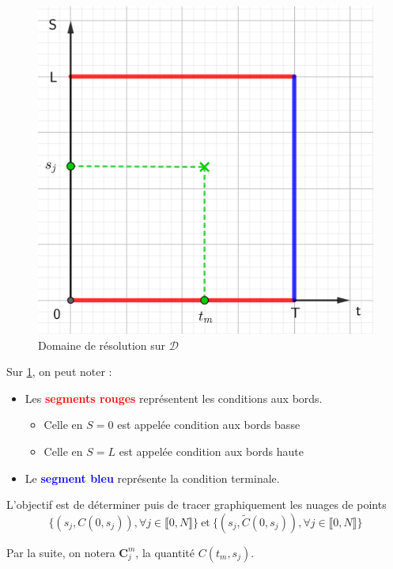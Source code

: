 \documentclass[11pt,a4paper]{article}
\newcommand*{\intval}[2]{\llbracket #1, #2 \rrbracket}
\theoremstyle{plain}
\begin{document}
\begin{figure}[h]
    \centering
    \includegraphics[scale=0.23]{img/situation_diagram.png}
    \caption{Domaine de résolution sur $\mathcal{D}$}
    \label{fig:domaine}
\end{figure}

Sur \ref{fig:domaine}, on peut noter :
\begin{itemize}
    \item Les \textcolor{red}{\textbf{segments rouges}} représentent les conditions aux bords.
    \begin{itemize}
        \item Celle en $S = 0$ est appelée condition aux bords basse
        \item Celle en $S = L$ est appelée condition aux bords haute
    \end{itemize}
    \item Le \textcolor{blue}{\textbf{segment bleu}} représente la condition terminale.
\end{itemize}

L'objectif est de déterminer puis de tracer graphiquement les nuages de points $$\lbrace (s_j, C(0, s_j)), \forall j \in \intval{0}{N} \rbrace \ \text{et} \ \lbrace (s_j, \widetilde{C}(0, s_j)), \forall j \in \intval{0}{N} \rbrace$$



Par la suite, on notera $\mathbf{C}^{m}_j$, la quantité $C(t_m, s_j)$.
\end{document}
